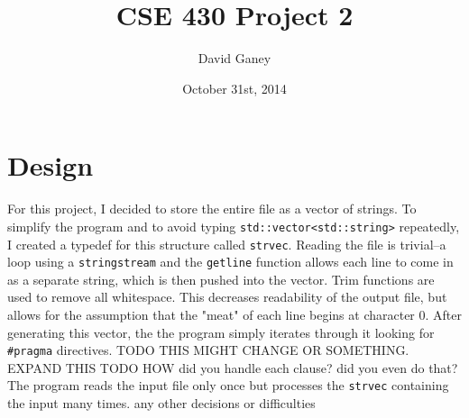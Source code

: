 \documentclass[]{article}
\begin{document}
\lstset{language=C++}

\begin{spacing}{.4}
\setlength{\droptitle}{-7em}
\title{CSE 430 Project 2}
\author{David Ganey}
\date{October 31st, 2014}
\maketitle
\end{spacing}

\section{Design}
For this project, I decided to store the entire file as a vector of strings. To simplify the program and to avoid typing \texttt{std::vector<std::string>} repeatedly, I created a typedef for this structure called \texttt{strvec}. Reading the file is trivial--a loop using a \texttt{stringstream} and the \texttt{getline} function allows each line to come in as a separate string, which is then pushed into the vector. Trim functions are used to remove all whitespace. This decreases readability of the output file, but allows for the assumption that the "meat" of each line begins at character 0.
\newline \newline
After generating this vector, the the program simply iterates through it looking for \texttt{\#pragma} directives. TODO THIS MIGHT CHANGE OR SOMETHING. EXPAND THIS
TODO HOW did you handle each clause? did you even do that?
\newline \newline
The program reads the input file only once but processes the \texttt{strvec} containing the input many times.
\newline \newline
any other decisions or difficulties
\end{document}
